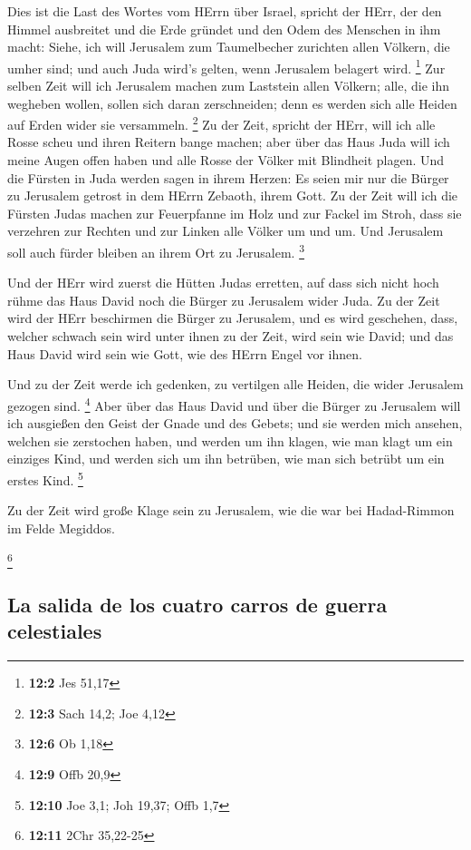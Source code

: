  Dies ist die Last des Wortes vom HErrn über Israel,
spricht der HErr, der den Himmel ausbreitet und die Erde gründet und den
Odem des Menschen in ihm macht:  Siehe, ich will Jerusalem
zum Taumelbecher zurichten allen Völkern, die umher sind; und auch Juda
wird's gelten, wenn Jerusalem belagert wird. \footnote{\textbf{12:2} Jes
  51,17}  Zur selben Zeit will ich Jerusalem machen zum
Laststein allen Völkern; alle, die ihn wegheben wollen, sollen sich
daran zerschneiden; denn es werden sich alle Heiden auf Erden wider sie
versammeln. \footnote{\textbf{12:3} Sach 14,2; Joe 4,12} 
Zu der Zeit, spricht der HErr, will ich alle Rosse scheu und ihren
Reitern bange machen; aber über das Haus Juda will ich meine Augen offen
haben und alle Rosse der Völker mit Blindheit plagen.  Und
die Fürsten in Juda werden sagen in ihrem Herzen: Es seien mir nur die
Bürger zu Jerusalem getrost in dem HErrn Zebaoth, ihrem Gott.
 Zu der Zeit will ich die Fürsten Judas machen zur
Feuerpfanne im Holz und zur Fackel im Stroh, dass sie verzehren zur
Rechten und zur Linken alle Völker um und um. Und Jerusalem soll auch
fürder bleiben an ihrem Ort zu Jerusalem. \footnote{\textbf{12:6} Ob
  1,18}

 Und der HErr wird zuerst die Hütten Judas erretten, auf
dass sich nicht hoch rühme das Haus David noch die Bürger zu Jerusalem
wider Juda.  Zu der Zeit wird der HErr beschirmen die
Bürger zu Jerusalem, und es wird geschehen, dass, welcher schwach sein
wird unter ihnen zu der Zeit, wird sein wie David; und das Haus David
wird sein wie Gott, wie des HErrn Engel vor ihnen.

 Und zu der Zeit werde ich gedenken, zu vertilgen alle
Heiden, die wider Jerusalem gezogen sind. \footnote{\textbf{12:9} Offb
  20,9}  Aber über das Haus David und über die Bürger zu
Jerusalem will ich ausgießen den Geist der Gnade und des Gebets; und sie
werden mich ansehen, welchen sie zerstochen haben, und werden um ihn
klagen, wie man klagt um ein einziges Kind, und werden sich um ihn
betrüben, wie man sich betrübt um ein erstes Kind. \footnote{\textbf{12:10}
  Joe 3,1; Joh 19,37; Offb 1,7}

 Zu der Zeit wird große Klage sein zu Jerusalem, wie die
war bei Hadad-Rimmon im Felde Megiddos.

\footnote{\textbf{12:11} 2Chr 35,22-25}

\hypertarget{la-salida-de-los-cuatro-carros-de-guerra-celestiales}{%
\subsection{La salida de los cuatro carros de guerra
celestiales}\label{la-salida-de-los-cuatro-carros-de-guerra-celestiales}}

